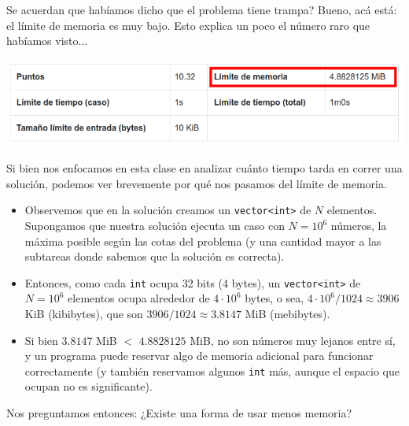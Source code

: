 \documentclass{beamer}
\begin{document}
    \begin{frame}[noframenumbering]
        Se acuerdan que habíamos dicho que el problema tiene trampa? \pause Bueno, acá está: el límite de memoria es muy bajo. \pause Esto explica un poco el número raro que habíamos visto... \pause

        \begin{center}
            \includegraphics[width=.6\linewidth]{./res/ou_ml.png}
        \end{center} \pause

        Si bien nos enfocamos en esta clase en analizar cuánto tiempo tarda en correr una solución, podemos ver brevemente por qué nos pasamos del límite de memoria.
    \end{frame}

    \begin{frame}[noframenumbering]
        \setlength{\leftmargini}{12pt}
        \begin{itemize}
            \item Observemos que en la solución creamos un \texttt{vector<int>} de $N$ elementos. \pause Supongamos que nuestra solución ejecuta un caso con $N = 10^6$ números, la máxima posible según las cotas del problema (y una cantidad mayor a las subtareas donde sabemos que la solución es correcta). \pause

            \item Entonces, como cada \texttt{int} ocupa 32 bits (4 bytes), un \texttt{vector<int>} de $N = 10^6$ elementos ocupa alrededor de $4 \cdot 10^6$ bytes, o sea, $4 \cdot 10^6 / 1024 \approx 3906$ KiB (kibibytes), que son $3906 / 1024 \approx 3.8147$ MiB (mebibytes). \pause

            \item Si bien $3.8147$ MiB $<$ $4.8828125$ MiB, no son números muy lejanos entre sí, y un programa puede reservar algo de memoria adicional para funcionar correctamente (y también reservamos algunos \texttt{int} más, aunque el espacio que ocupan no es significante).
        \end{itemize} \pause

        Nos preguntamos entonces: ¿Existe una forma de usar menos memoria?
    \end{frame}
\end{document}
